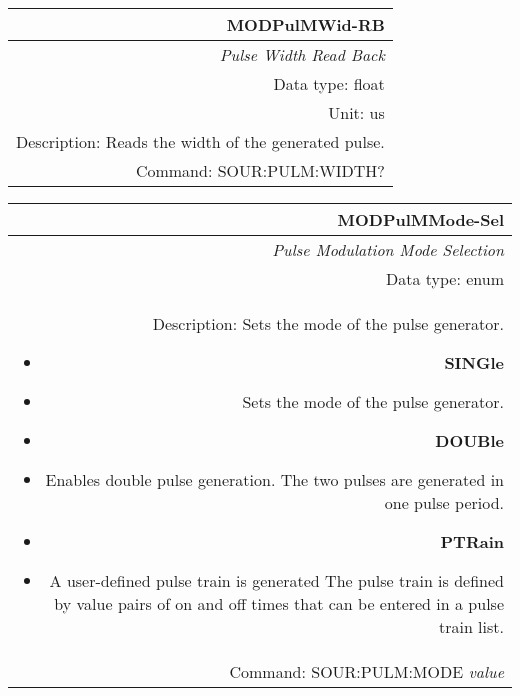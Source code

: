 \documentclass[openany]{article}
\begin{document}
		\begin{tabular}{N}
			\hline
			\bfseries MODPulMWid-RB \\ \hline
			\emph{Pulse Width Read Back} \\
			Data type: float \\
			Unit: us \\
			Description: Reads the width of the generated pulse. \\
			Command: SOUR:PULM:WIDTH? \\

		\end{tabular}
%
		\begin{tabular}{N}
			\hline
			\bfseries MODPulMMode-Sel \\ \hline
			\emph{Pulse Modulation Mode Selection} \\
			Data type: enum \\  
			Description: Sets the mode of the pulse generator.\begin{itemize}[noitemsep]
				\small
				\item[] \textbf{SINGle}
                                \item[] Sets the mode of the pulse generator.
                                \item[] \textbf{DOUBle}
                                \item[] Enables double pulse generation. The two pulses are generated in one pulse period.
				\item[] \textbf{PTRain}
                                \item[] A user-defined pulse train is generated The pulse train is defined by value pairs of on and off times that can be entered in a pulse train list.

			\end{itemize} \\
			Command: SOUR:PULM:MODE \emph{value} \\

		\end{tabular}
\end{document}
